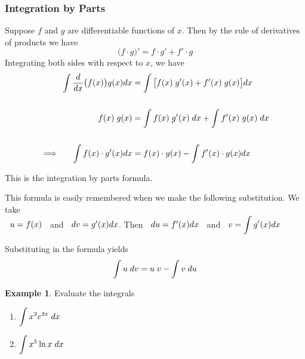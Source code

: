 \documentclass[11pt,a4paper]{article}
\theoremstyle{definition}
\newtheorem{exa}[thm]{Example}
\begin{document}
\subsubsection{Integration by Parts}
Suppose $f$ and $g$ are differentiable functions of $x$. Then by the rule of derivatives of products we have $$\big(f\cdot g\big)' = f\cdot g' + f'\cdot g$$
Integrating both sides with respect to $x$, we have 
\begin{align*}
\int \dfrac{d}{dx}\big(f(x)\big) g(x) dx & = \int \big[ f(x)\hspace{0.1cm} g'(x) + f'(x)\hspace{0.1cm}g(x)\big]dx\\\\
f(x)\hspace{0.1cm}g(x) & = \int f(x)\hspace{0.1cm}g'(x)\hspace{0.1cm}dx + \int f'(x)\hspace{0.1cm} g(x)\hspace{0.1cm} dx\\\\
\implies \hspace{0.5cm} \int f(x)\cdot g'(x) dx & = f(x)\cdot g(x) - \int f'(x) \cdot g(x) dx
\end{align*}

This is the integration by parts formula.


This formula is easily remembered when we make the following substitution. We take\\ $\hspace{0.2cm} u = f(x)\hspace{0.2cm}$ and $\hspace{0.2cm} dv = g'(x)dx$. Then $\hspace{0.2cm} du = f'(x)dx\hspace{0.2cm}$ and $\hspace{0.2cm} v = \displaystyle{\int g'(x)dx}$


Substituting in the formula yields
$$\int u\hspace{0.1cm}dv = u\hspace{0.1cm}v - \int v\hspace{0.1cm}du$$


\begin{exa}
Evaluate the integrals
\begin{enumerate}
\item $\displaystyle{\int x^2e^{2x}\hspace{0.1cm}dx}$
\item $\displaystyle{\int x^5 \ln x\hspace{0.1cm} dx}$
\end{enumerate}
\end{exa}
\end{document}
